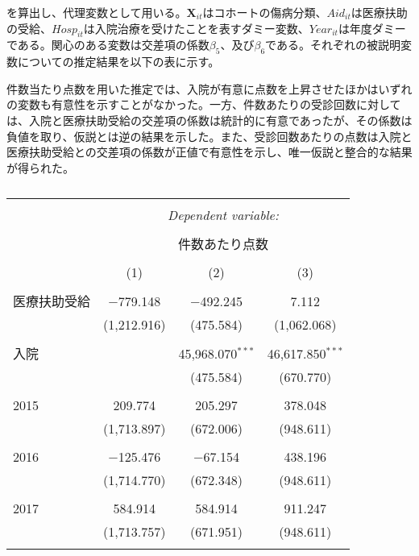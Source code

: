 \documentclass{jsarticle}
\begin{document}
を算出し、代理変数として用いる。$\mathbf{X}_{it}$はコホートの傷病分類、$\textit{Aid}_{it}$は医療扶助の受給、$\textit{Hosp}_{it}$は入院治療を受けたことを表すダミー変数、$\textit{Year}_{it}$は年度ダミーである。関心のある変数は交差項の係数$\beta_5$、及び$\beta_6$である。それぞれの被説明変数についての推定結果を以下の表に示す。

 件数当たり点数を用いた推定では、入院が有意に点数を上昇させたほかはいずれの変数も有意性を示すことがなかった。一方、件数あたりの受診回数に対しては、入院と医療扶助受給の交差項の係数は統計的に有意であったが、その係数は負値を取り、仮説とは逆の結果を示した。また、受診回数あたりの点数は入院と医療扶助受給との交差項の係数が正値で有意性を示し、唯一仮説と整合的な結果が得られた。
 
\begin{table}[!htbp] \centering 
  \caption{} 
  \label{} 
  \small
\begin{tabular}{@{\extracolsep{5pt}}lccc} 
\\[-1.8ex]\hline 
\hline \\[-1.8ex] 
 & \multicolumn{3}{c}{\textit{Dependent variable:}} \\ 
\cline{2-4} 
\\[-1.8ex] & \multicolumn{3}{c}{件数あたり点数} \\ 
\\[-1.8ex] & (1) & (2) & (3)\\ 
\hline \\[-1.8ex] 
 医療扶助受給 & $-$779.148 & $-$492.245 & 7.112 \\ 
  & (1,212.916) & (475.584) & (1,062.068) \\ 
  & & & \\ 
 入院 &  & 45,968.070$^{***}$ & 46,617.850$^{***}$ \\ 
  &  & (475.584) & (670.770) \\ 
  & & & \\ 
 2015 & 209.774 & 205.297 & 378.048 \\ 
  & (1,713.897) & (672.006) & (948.611) \\ 
  & & & \\ 
 2016 & $-$125.476 & $-$67.154 & 438.196 \\ 
  & (1,714.770) & (672.348) & (948.611) \\ 
  & & & \\ 
 2017 & 584.914 & 584.914 & 911.247 \\ 
  & (1,713.757) & (671.951) & (948.611) \\ 
  & & & \\ 

\end{tabular}
\end{table}
\end{document}
